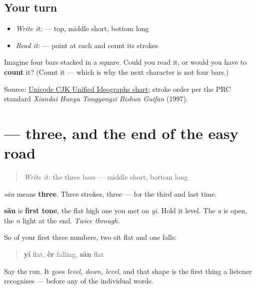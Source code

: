 \subsection*{Your turn}
\begin{itemize}
\raggedright
  \item \emph{Write it:}  — top, middle short, bottom long
  \item \emph{Read it:}    — point at each and count its strokes
\end{itemize}

\begin{tcolorbox}[breakable,colback=teal!4,colframe=teal!35!black,title={Before you move on}]
Imagine four bars stacked in a square. Could you read it, or would you have to \textbf{count} it? (Count it — which is why the next character is not four bars.)

Source: \href{https://www.unicode.org/charts/PDF/U4E00.pdf}{Unicode CJK Unified Ideographs chart}; stroke order per the PRC standard \emph{Xiandai Hanyu Tongyongzi Bishun Guifan} (1997).
\end{tcolorbox}
\section[\texorpdfstring{\zh{三} (sān)}{三 (sān)}]{ — three, and the end of the easy road}

\label{lesson:ZH-C03-san}



\begin{quote}
\emph{Write it:} the three bars — middle short, bottom long
\end{quote}

\begin{sounds}
\textbf{} \emph{sān} means \textbf{three}. Three strokes, three — for the third and last time.

\textbf{sān} is \textbf{first tone}, the flat high one you met on \emph{yī}. Hold it level. The \emph{a} is open, the \emph{n} light at the end. \emph{Twice through.}

So of your first three numbers, two sit flat and one falls:

\begin{quote}
\textbf{yī} flat, \textbf{èr} falling, \textbf{sān} flat
\end{quote}

Say the run. It goes \emph{level, down, level}, and that shape is the first thing a listener recognises — before any of the individual words.
\end{sounds}

